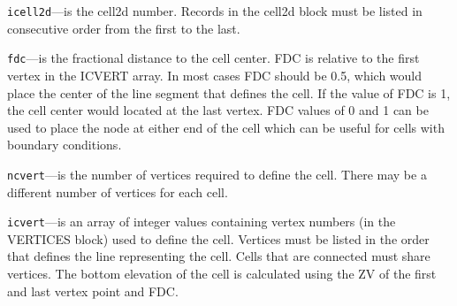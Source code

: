 \begin{description}
\item \texttt{icell2d}---is the cell2d number.  Records in the cell2d block must be listed in consecutive order from the first to the last.

\item \texttt{fdc}---is the fractional distance to the cell center. FDC is relative to the first vertex in the ICVERT array. In most cases FDC should be 0.5, which would place the center of the line segment that defines the cell. If the value of FDC is 1, the cell center would located at the last vertex. FDC values of 0 and 1 can be used to place the node at either end of the cell which can be useful for cells with boundary conditions.

\item \texttt{ncvert}---is the number of vertices required to define the cell.  There may be a different number of vertices for each cell.

\item \texttt{icvert}---is an array of integer values containing vertex numbers (in the VERTICES block) used to define the cell.  Vertices must be listed in the order that defines the line representing the cell.  Cells that are connected must share vertices. The bottom elevation of the cell is calculated using the ZV of the first and last vertex point and FDC.

\end{description}

